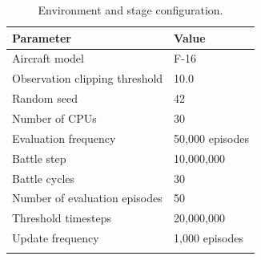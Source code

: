 \documentclass[pdflatex,sn-mathphys-num]{sn-jnl}%
\theoremstyle{thmstyleone}%
\theoremstyle{thmstyletwo}%
\theoremstyle{thmstylethree}%
\begin{document}
\begin{appendices}
\begin{table}[h]
\caption{Environment and stage configuration.}\label{tab:env_stage}%
\begin{tabular}{@{}ll@{}}
\toprule
Parameter & Value \\
\midrule
Aircraft model & F-16 \\
Observation clipping threshold & 10.0 \\
Random seed & 42 \\
Number of CPUs & 30 \\
Evaluation frequency & 50,000 episodes \\
Battle step & 10,000,000 \\
Battle cycles & 30 \\
Number of evaluation episodes & 50 \\
Threshold timesteps & 20,000,000 \\
Update frequency & 1,000 episodes \\
\botrule
\end{tabular}
\end{table}



\end{appendices}
\end{document}

